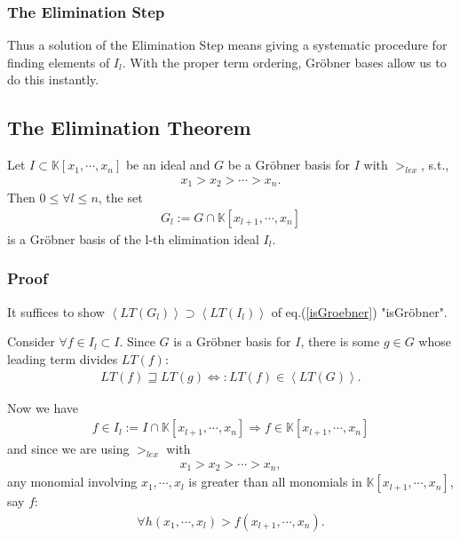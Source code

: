 \documentclass[11pt]{book}
\begin{document}
\subsubsection{The Elimination Step}
Thus a solution of the Elimination Step means giving a systematic procedure for finding elements of $I_l$.
With the proper term ordering, Gr\"obner bases allow us to do this instantly.

\subsection{The Elimination Theorem}
Let $I \subset \mathbb{K}[x_1, \cdots, x_n]$ be an ideal and $G$ be a Gr\"obner basis for $I$ with $>_{lex}$, s.t.,
\begin{eqnarray}
x_1 > x_2 > \cdots > x_n.
\end{eqnarray}
Then $ 0 \leq \forall l \leq n$, the set
\begin{eqnarray}
G_l := G \cap \mathbb{K}[x_{l+1}, \cdots, x_n]
\end{eqnarray}
is a Gr\"obner basis of the l-th elimination ideal $I_l$.

\subsubsection{Proof}
It suffices to show $\left< LT(G_l) \right> \supset \left< LT(I_l)\right>$ of eq.(\ref{isGroebner}) "isGr\"obner".

Consider $\forall f \in I_l \subset I$.
Since $G$ is a Gr\"obner basis for $I$, there is some $g \in G$ whose leading term divides $LT(f)$:
\begin{eqnarray}
LT(f) \sqsupseteq LT(g) \Leftrightarrow : LT(f) \in \left< LT(G) \right>.
\end{eqnarray}

Now we have
\begin{eqnarray}
f \in I_l := I \cap \mathbb{K}[x_{l+1}, \cdots, x_n] \Rightarrow f \in \mathbb{K}[x_{l+1}, \cdots, x_n]
\end{eqnarray}
and since we are using $>_{lex}$ with
\begin{eqnarray}
x_1 > x_2 > \cdots > x_n,
\end{eqnarray}
any monomial involving $x_1, \cdots, x_l$ is greater than all monomials in $\mathbb{K}[x_{l+1}, \cdots, x_n]$, say $f$:
\begin{eqnarray}
\forall h(x_1, \cdots, x_l) > f(x_{l+1}, \cdots, x_n).
\end{eqnarray}
\end{document}

